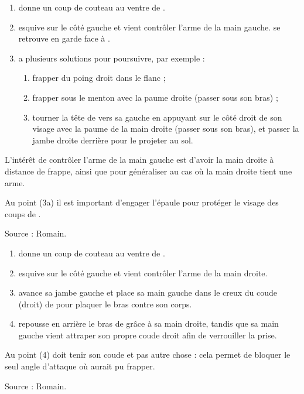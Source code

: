 \begin{technique}

\begin{enumerate}
	\item \A donne un coup de couteau au ventre de \D.
	
	\item \D esquive sur le côté gauche et vient contrôler l'arme de la main gauche.
	\D se retrouve en garde face à \A.
	
	\item \D a plusieurs solutions pour poursuivre, par exemple :
	\begin{enumerate}
		\item frapper du poing droit dans le flanc ;
		
		\item frapper \A sous le menton avec la paume droite (passer sous son bras) ;
		
		\item tourner la tête de \A vers sa gauche en appuyant sur le côté droit de son visage avec la paume de la main droite (passer sous son bras), et passer la jambe droite derrière \A pour le projeter au sol.
	\end{enumerate}

\end{enumerate}

L'intérêt de contrôler l'arme de la main gauche est d'avoir la main droite à distance de frappe, ainsi que pour généraliser au cas où la main droite tient une arme.

Au point (3a) il est important d'engager l'épaule pour protéger le visage des coups de \A.

Source : Romain.

\end{technique}


\begin{technique}

\begin{enumerate}
	\item \A donne un coup de couteau au ventre de \D.
	
	\item \D esquive sur le côté gauche et vient contrôler l'arme de la main droite.
	
	\item \D avance sa jambe gauche et place sa main gauche dans le creux du coude (droit) de \A pour plaquer le bras contre son corps.
	
	\item \D repousse en arrière le bras de \A grâce à sa main droite, tandis que sa main gauche vient attraper son propre coude droit afin de verrouiller la prise.
\end{enumerate}

Au point (4) \D doit tenir son coude et pas autre chose : cela permet de bloquer le seul angle d'attaque où \A aurait pu frapper.

Source : Romain.

\end{technique}


